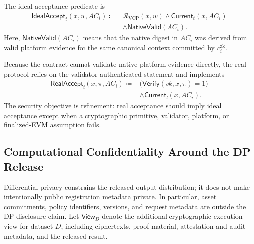 \documentclass[10pt,journal,compsoc]{IEEEtran}
\begin{document}
The ideal acceptance predicate is
\begin{equation}
\begin{aligned}
\mathsf{IdealAccept}_t(x,w,AC_i)\coloneqq{}&
\mathcal{R}_{\mathrm{VCP}}(x,w)
\land\mathsf{Current}_t(x,AC_i)\\
&\land\mathsf{NativeValid}(AC_i).
\end{aligned}
\label{eq:ideal_acceptance_predicate}
\end{equation}
Here, $\mathsf{NativeValid}(AC_i)$ means that the native digest in $AC_i$ was derived from valid platform evidence for the same canonical context committed by $c_i^{\mathrm{zk}}$.

Because the contract cannot validate native platform evidence directly, the real protocol relies on the validator-authenticated statement and implements
\begin{equation}
\begin{aligned}
\mathsf{RealAccept}_t(x,\pi,AC_i)\coloneqq{}&
\bigl(\mathsf{Verify}(vk,x,\pi)=1\bigr)\\
&\land\mathsf{Current}_t(x,AC_i).
\end{aligned}
\label{eq:real_acceptance_predicate}
\end{equation}
The security objective is refinement: real acceptance should imply ideal acceptance except when a cryptographic primitive, validator, platform, or finalized-EVM assumption fails.

\subsection{Computational Confidentiality Around the DP Release}
\label{subsec:security_confidentiality}

Differential privacy constrains the released output distribution; it does not make intentionally public registration metadata private. In particular, asset commitments, policy identifiers, versions, and request metadata are outside the DP disclosure claim. Let $\mathsf{View}_{D}$ denote the additional cryptographic execution view for dataset $D$, including ciphertexts, proof material, attestation and audit metadata, and the released result.
\end{document}
